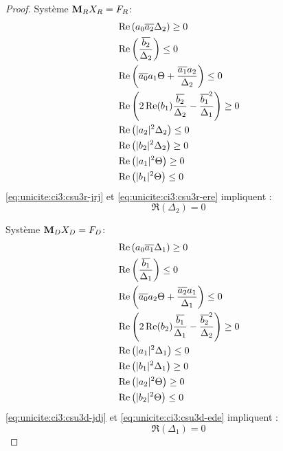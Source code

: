 \begin{proof}
    \begin{minipage}{0.49\textwidth}
      {Système \(\mathbf{M}_RX_R=F_R\)}:
      \begin{align}
        \label{eq:unicite:ci3:csu3r-j2}&\operatorname{Re}\left(a_0{\overline{a_2}}\Delta_2\right) \ge 0 \\
        \label{eq:unicite:ci3:csu3r-e2}&\operatorname{Re}\left(\dfrac{{\overline{b_2}}}{\Delta_2}\right) \le 0 \\
        \label{eq:unicite:ci3:csu3r-jdj}&\operatorname{Re}\left({\overline{a_0}}a_1\Theta + \dfrac{{\overline{a_1}}a_2}{\Delta_2} \right)\le 0\\
        \label{eq:unicite:ci3:csu3r-ede}&\operatorname{Re}\left(2\operatorname{Re}(b_1)\dfrac{{\overline{b_2}}}{\Delta_2}-\dfrac{{\overline{b_1}}^2}{\Delta_1}\right) \ge 0\\
        \label{eq:unicite:ci3:csu3r-jrj}&\operatorname{Re}\left(|a_2|^2\Delta_2\right) \le 0 \\
        \label{eq:unicite:ci3:csu3r-ere}&\operatorname{Re}\left(|b_2|^2\Delta_2\right) \ge 0 \\
        \label{eq:unicite:ci3:csu3r-rj2}&\operatorname{Re}\left(|a_1|^2\Theta\right)\ge 0\\
        \label{eq:unicite:ci3:csu3r-re2}&\operatorname{Re}\left(|b_1|^2\Theta\right)\le 0
      \end{align}
      \eqref{eq:unicite:ci3:csu3r-jrj} et \eqref{eq:unicite:ci3:csu3r-ere} impliquent :
      \begin{equation}
        \label{eq:unicite:ci3:csu3r-jre}
        \Re\left(\Delta_2\right) = 0
      \end{equation}
    \end{minipage}
    \begin{minipage}{0.49\textwidth}
      {Système \(\mathbf{M}_DX_D=F_D\)}:
      \begin{align}
        \label{eq:unicite:ci3:csu3d-j2}&\operatorname{Re}\left(a_0{\overline{a_1}}\Delta_1\right) \ge 0 \\
        \label{eq:unicite:ci3:csu3d-e2}&\operatorname{Re}\left(\dfrac{{\overline{b_1}}}{\Delta_1}\right) \le 0 \\
        \label{eq:unicite:ci3:csu3d-jrj}&\operatorname{Re}\left({\overline{a_0}}a_2\Theta + \dfrac{{\overline{a_2}}a_1}{\Delta_1} \right)\le 0\\
        \label{eq:unicite:ci3:csu3d-ere}&\operatorname{Re}\left(2\operatorname{Re}(b_2)\dfrac{{\overline{b_1}}}{\Delta_1}-\dfrac{{\overline{b_2}}^2}{\Delta_2}\right) \ge 0\\
        \label{eq:unicite:ci3:csu3d-jdj}&\operatorname{Re}\left(|a_1|^2\Delta_1\right) \le 0 \\
        \label{eq:unicite:ci3:csu3d-ede}&\operatorname{Re}\left(|b_1|^2\Delta_1\right) \ge 0 \\
        \label{eq:unicite:ci3:csu3d-dj2}&\operatorname{Re}\left(|a_2|^2\Theta\right)\ge 0\\
        \label{eq:unicite:ci3:csu3d-de2}&\operatorname{Re}\left(|b_2|^2\Theta\right)\le 0
      \end{align}
      \eqref{eq:unicite:ci3:csu3d-jdj} et \eqref{eq:unicite:ci3:csu3d-ede} impliquent :
      \begin{equation}
        \label{eq:unicite:ci3:csu3d-jde}
        \Re\left(\Delta_1\right) = 0
      \end{equation}
    \end{minipage}


\end{proof}
